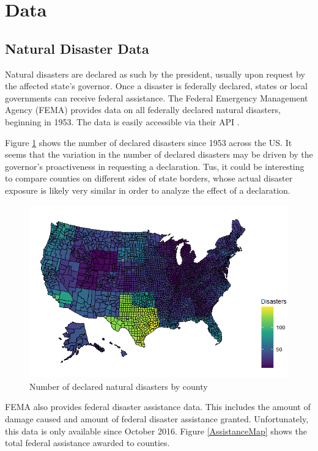 
\section{Data}

\subsection{Natural Disaster Data}

Natural disasters are declared as such by the president, usually upon request by the affected state's governor. Once a disaster is federally declared, states or local governments can receive federal assistance. The Federal Emergency Management Agency (FEMA) provides data on all federally declared natural disasters, beginning in 1953. The data is easily accessible via their API \citep{rfema}.



Figure \ref{DisasterMap} shows the number of declared disasters since 1953 across the US. It seems that the variation in the number of declared disasters may be driven by the governor's proactiveness in requesting a declaration. Tus, it could be interesting to compare counties on different sides of state borders, whose actual disaster exposure is likely very similar in order to analyze the effect of a declaration.



\begin{figure}[!h]
	\centering
	\includegraphics[scale=0.7]{"../Code & Data/DisasterMap.png"}
	\caption{Number of declared natural disasters by county}
	\label{DisasterMap}
\end{figure}


FEMA also provides federal disaster assistance data. This includes the amount of damage caused and amount of federal disaster assistance granted. Unfortunately, this data is only available since October 2016. Figure \ref{AssistanceMap} shows the total federal assistance awarded to counties.


